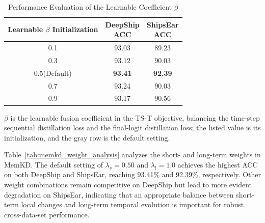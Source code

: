 ﻿\documentclass[lettersize,journal]{IEEEtran}
\begin{document}
\begin{table}[htbp]
\centering
\caption{Performance Evaluation of the Learnable Coefficient $\beta$}
\label{tab:beta_analysis}
\small
\setlength{\tabcolsep}{10pt}
\begin{tabular}{c|c|c}
\toprule
\makecell{Learnable $\beta$\\Initialization} &
\makecell{DeepShip\\ACC} &
\makecell{ShipsEar\\ACC} \\
\midrule
0.1 & 93.03 & 89.23 \\
0.3 & 93.12 & 90.03 \\
\rowcolor{gray!15}
0.5(Default) & \textbf{93.41} & \textbf{92.39} \\
0.7 & 93.24 & 90.03 \\
0.9 & 93.17 & 90.56 \\
\bottomrule
\end{tabular}
\vspace{0.5ex}
\par\footnotesize $\beta$ is the learnable fusion coefficient in the TS-T objective, balancing the time-step sequential distillation loss and the final-logit distillation loss; the listed value is its initialization, and the gray row is the default setting.
\end{table}

Table~\ref{tab:memkd_weight_analysis} analyzes the short- and long-term weights in MemKD. The default setting of $\lambda_s=0.50$ and $\lambda_l=1.0$ achieves the highest ACC on both DeepShip and ShipsEar, reaching 93.41\% and 92.39\%, respectively. Other weight combinations remain competitive on DeepShip but lead to more evident degradation on ShipsEar, indicating that an appropriate balance between short-term local changes and long-term temporal evolution is important for robust cross-data-set performance.
\end{document}
